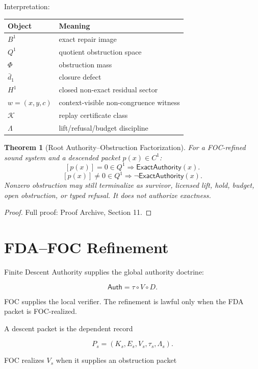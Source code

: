 \documentclass[11pt]{article}
\newtheorem{theorem}{Theorem}[section]
\begin{document}
Interpretation:

\begin{center}
\begin{tabular}{ll}
\toprule
Object & Meaning \\
\midrule
\(B^1\) & exact repair image \\
\(Q^1\) & quotient obstruction space \\
\(\Phi\) & obstruction mass \\
\(\bar d_1\) & closure defect \\
\(H^1\) & closed non-exact residual sector \\
\(w=(x,y,c)\) & context-visible non-congruence witness \\
\(\mathcal K\) & replay certificate class \\
\(\Lambda\) & lift/refusal/budget discipline \\
\bottomrule
\end{tabular}
\end{center}

\begin{theorem}[Root Authority--Obstruction Factorization] \label{thm:root_auth}
For a FOC-refined sound system and a descended packet \(p(x)\in C^1\):
\[
\boxed{
[p(x)]=0\in Q^1\Rightarrow\mathsf{ExactAuthority}(x).
}
\]
\[
\boxed{
[p(x)]\neq0\in Q^1\Rightarrow\neg\mathsf{ExactAuthority}(x).
}
\]
Nonzero obstruction may still terminalize as survivor, licensed lift, hold, budget, open obstruction, or typed refusal. It does not authorize exactness.
\end{theorem}

\begin{proof}
Full proof: Proof Archive, Section 11.
\end{proof}

\section{FDA--FOC Refinement}

Finite Descent Authority supplies the global authority doctrine:

\[
\boxed{
\mathsf{Auth}=\tau\circ V\circ D.
}
\]

FOC supplies the local verifier. The refinement is lawful only when the FDA packet is FOC-realized.

A descent packet is the dependent record

\[
P_s=(K_s,E_s,V_s,\tau_s,\Lambda_s).
\]

FOC realizes \(V_s\) when it supplies an obstruction packet
\end{document}
